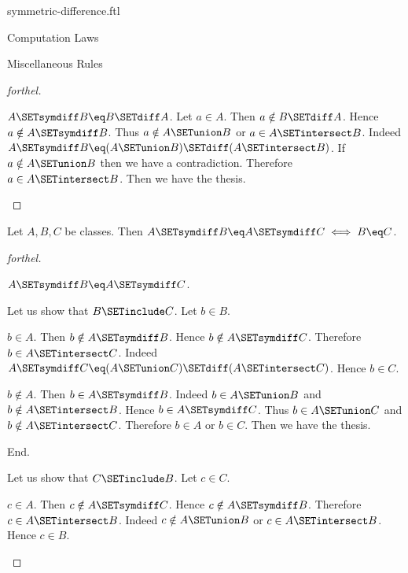 \documentclass{naproche-library}
\begin{document}
\begin{smodule}[title=Symmetric Difference]{symmetric-difference.ftl}
\begin{sfragment}{Computation Laws}
\begin{sfragment}{Miscellaneous Rules}
\begin{proof}[forthel]
      \begin{case}{$A \SETsymdiff B \eq B \SETdiff A$.}
        Let $a \in A$.
        Then $a \notin B \SETdiff A$.
        Hence $a \notin A \SETsymdiff B$.
        Thus $a \notin A \SETunion B$ or $a \in A \SETintersect B$.
        Indeed $A \SETsymdiff B \eq (A \SETunion B) \SETdiff (A \SETintersect B)$.
        If $a \notin A \SETunion B$ then we have a contradiction.
        Therefore $a \in A \SETintersect B$.
        Then we have the thesis.
      \end{case}
    \end{proof}

    \begin{proposition}[forthel,id=FOUNDATIONS_03_4490230937681920]
      Let $A, B, C$ be classes.
      Then $A \SETsymdiff B \eq A \SETsymdiff C \iff B \eq C$.
    \end{proposition}
    \begin{proof}[forthel]
      \begin{case}{$A \SETsymdiff B \eq A \SETsymdiff C$.}

        Let us show that $B \SETinclude C$.
          Let $b \in B$.

          \begin{case}{$b \in A$.}
            Then $b \notin A \SETsymdiff B$.
            Hence $b \notin A \SETsymdiff C$.
            Therefore $b \in A \SETintersect C$.
            Indeed $A \SETsymdiff C \eq (A \SETunion C) \SETdiff (A \SETintersect C)$.
            Hence $b \in C$.
          \end{case}

          \begin{case}{$b \notin A$.}
            Then $b \in A \SETsymdiff B$.
            Indeed $b \in A \SETunion B$ and $b \notin A \SETintersect B$.
            Hence $b \in A \SETsymdiff C$.
            Thus $b \in A \SETunion C$ and $b \notin A \SETintersect C$.
            Therefore $b \in A$ or $b \in C$.
            Then we have the thesis.
          \end{case}
        End.

        Let us show that $C \SETinclude B$.
          Let $c \in C$.

          \begin{case}{$c \in A$.}
            Then $c \notin A \SETsymdiff C$.
            Hence $c \notin A \SETsymdiff B$.
            Therefore $c \in A \SETintersect B$.
            Indeed $c \notin A \SETunion B$ or $c \in A \SETintersect B$.
            Hence $c \in B$.
          \end{case}


\end{case}
\end{proof}
\end{sfragment}
\end{sfragment}
\end{smodule}
\end{document}
